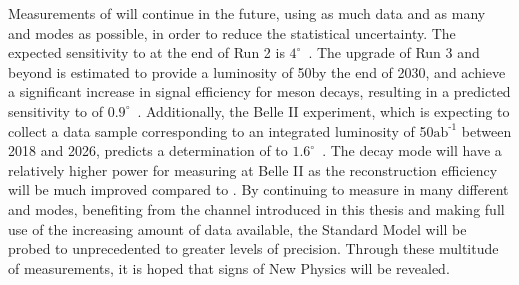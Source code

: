 Measurements of \Pgamma will continue in the future, using as much data and as many \B and \D modes as possible, in order to reduce the statistical uncertainty. The expected sensitivity to \Pgamma at the end of Run 2 is $4^{\circ}$~\cite{LHCb-PAPER-2012-031}. The upgrade of Run 3 and beyond is estimated to provide a luminosity of 50\invfb by the end of 2030, and achieve a significant increase in signal efficiency for \B meson decays, resulting in a predicted sensitivity to \Pgamma of $0.9^{\circ}$~\cite{LHCb-PAPER-2012-031}. Additionally, the Belle II experiment, which is expecting to collect a data sample corresponding to an integrated luminosity of 50$\text{ab}^{\text{-1}}$ between 2018 and 2026, predicts a determination of \Pgamma to $1.6^{\circ}$~\cite{BelleII}. The \decay{\Bm}{\D\Kstarm(\KS\pim)} decay mode will have a relatively higher power for measuring \Pgamma at Belle II as the \KS reconstruction efficiency will be much improved compared to \lhcb. By continuing to measure \Pgamma in many different \B and \D modes, benefiting from the \btodkst channel introduced in this thesis and making full use of the increasing amount of data available, the Standard Model will be probed to unprecedented to greater levels of precision. Through these multitude of measurements, it is hoped that signs of New Physics will be revealed.

\clearpage